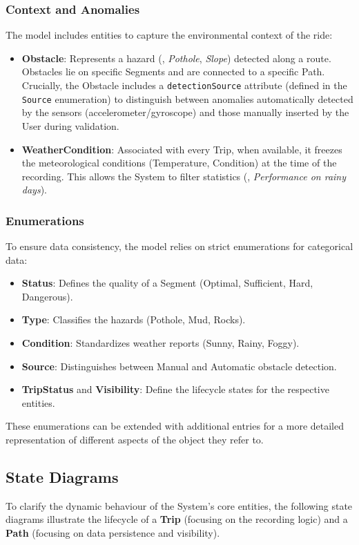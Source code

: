 \subsubsection*{Context and Anomalies}
The model includes entities to capture the environmental context of the ride:

\begin{itemize}
    \item \textbf{Obstacle}: Represents a hazard (\eg, \emph{Pothole}, \emph{Slope}) detected along a route. Obstacles lie on specific Segments and are connected to a specific Path.
    Crucially, the Obstacle includes a \texttt{detectionSource} attribute (defined in the \texttt{Source} enumeration) to distinguish between anomalies automatically detected by the sensors (accelerometer/gyroscope) and those manually inserted by the User during validation.
    
    \item \textbf{WeatherCondition}: Associated with every Trip, when available, it freezes the meteorological conditions (Temperature, Condition) at the time of the recording. This allows the System to filter statistics (\eg, \emph{Performance on rainy days}).
\end{itemize}

\subsubsection*{Enumerations}
To ensure data consistency, the model relies on strict enumerations for categorical data:
\begin{itemize}
    \item \textbf{Status}: Defines the quality of a Segment (Optimal, Sufficient, Hard, Dangerous).
    \item \textbf{Type}: Classifies the hazards (Pothole, Mud, Rocks).
    \item \textbf{Condition}: Standardizes weather reports (Sunny, Rainy, Foggy).
    \item \textbf{Source}: Distinguishes between Manual and Automatic obstacle detection.
    \item \textbf{TripStatus} and \textbf{Visibility}: Define the lifecycle states for the respective entities.
\end{itemize}
These enumerations can be extended with additional entries for a more detailed representation of different aspects of the object they refer to.
\subsection{State Diagrams}
To clarify the dynamic behaviour of the System's core entities, the following state diagrams illustrate the lifecycle of a \textbf{Trip} (focusing on the recording logic) and a \textbf{Path} (focusing on data persistence and visibility).


